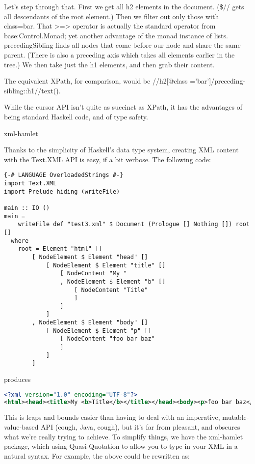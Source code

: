 Let's step through that. First we get all h2 elements in the document.
(\$// gets all descendants of the root element.) Then we filter out only those
with class=bar. That >=> operator is actually
the standard operator from base:Control.Monad; yet another advantage
of the monad instance of lists. precedingSibling finds all nodes that come
before our node and share the same parent. (There is also a preceding axis which takes all elements earlier in the tree.) We then take just the
h1 elements, and then grab their content.

The equivalent XPath, for comparison, would be //h2[@class ='bar']/preceding-sibling::h1//text().

While the cursor API isn't quite as succinct as XPath, it has the advantages of being standard
Haskell code, and of type safety.

xml-hamlet

Thanks to the simplicity of Haskell's data type system, creating
XML content with the Text.XML API is easy, if a bit verbose. The
following code:

\begin{lstlisting}
{-# LANGUAGE OverloadedStrings #-}
import Text.XML
import Prelude hiding (writeFile)

main :: IO ()
main =
    writeFile def "test3.xml" $ Document (Prologue [] Nothing []) root []
  where
    root = Element "html" []
        [ NodeElement $ Element "head" []
            [ NodeElement $ Element "title" []
                [ NodeContent "My "
                , NodeElement $ Element "b" []
                    [ NodeContent "Title"
                    ]
                ]
            ]
        , NodeElement $ Element "body" []
            [ NodeElement $ Element "p" []
                [ NodeContent "foo bar baz"
                ]
            ]
        ]
\end{lstlisting}

  produces

\begin{lstlisting}[language=XML]
<?xml version="1.0" encoding="UTF-8"?>
<html><head><title>My <b>Title</b></title></head><body><p>foo bar baz</p></body></html>
\end{lstlisting}

This is leaps and bounds easier than having to deal with an imperative, mutable-value-based API
(cough, Java, cough), but it's far from pleasant, and obscures what we're really trying to
achieve. To simplify things, we have the xml-hamlet package, which using
Quasi-Quotation to allow you to type in your XML in a natural syntax. For example, the above
could be rewritten as:

